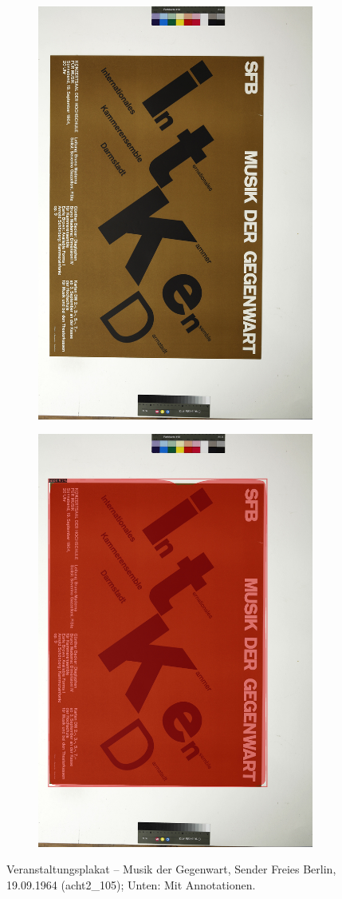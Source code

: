 \documentclass[a4paper,12pt,ngerman]{article}
\begin{document}
\newpage
\begin{figure}[ht]
	\begin{subfigure}[b]{\linewidth}
	\centering
	\includegraphics[height=\linewidth, angle=90]{Abbildung_23_(acht2_105)}
	\end{subfigure}
	\begin{subfigure}[b]{\linewidth}
	\centering
	\includegraphics[height=\linewidth, angle=90]{Abbildung_23_(acht2_105)_with_detections}
	\end{subfigure}
	\caption{Veranstaltungsplakat -- Musik der Gegenwart, Sender Freies Berlin, 19.09.1964 (acht2\_105); Unten: Mit Annotationen.}
\end{figure}
\end{document}

